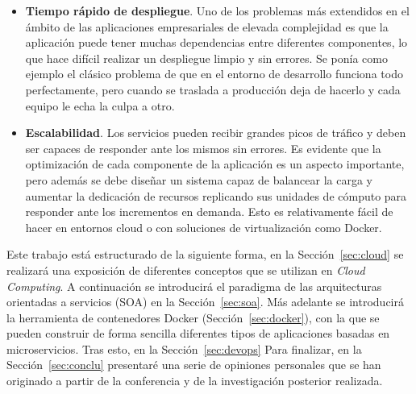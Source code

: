 \begin{itemize}
\begin{figure}
\caption{\label{fig:zerodt}Esquema de recuperación ante fallos.}
\end{figure}
Cómo se puede observar en la Figura~\ref{fig:zerodt}, cuando el servidor físico A falla, se desencadena una migración del contenedor virtual al servidor B. Lo que debería ocurrir sin complicaciones en caso de que el volumen de datos compartido por red siga disponible y solo haya ocurrido un problema aislado en la máquina A. En general, el demonio encargado de vigilar el correcto funcionamiento de los nodos se denomina \textit{watchdog} y su funcionamiento se basa en el intercambio periódico de mensajes con los nodos del cluster para intercambiar información del estado del servicio (\textit{keepalive o hearbeat}).
\item \textbf{Tiempo rápido de despliegue}. Uno de los problemas más extendidos en el ámbito de las aplicaciones empresariales de elevada complejidad es que la aplicación puede tener muchas dependencias entre diferentes componentes, lo que hace difícil realizar un despliegue limpio y sin errores. Se ponía como ejemplo el clásico problema de que en el entorno de desarrollo funciona todo perfectamente, pero cuando se traslada a producción deja de hacerlo y cada equipo le echa la culpa a otro.
\item \textbf{Escalabilidad}. Los servicios pueden recibir grandes picos de tráfico y deben ser capaces de responder ante los mismos sin errores. Es evidente que la optimización de cada componente de la aplicación es un aspecto importante, pero además se debe diseñar un sistema capaz de balancear la carga y aumentar la dedicación de recursos replicando sus unidades de cómputo para responder ante los incrementos en demanda. Esto es relativamente fácil de hacer en entornos cloud o con soluciones de virtualización como Docker.
\end{itemize}

Este trabajo está estructurado de la siguiente forma, en la Sección~\ref{sec:cloud} se realizará una exposición de diferentes conceptos que se utilizan en \emph{Cloud Computing}. A continuación se introducirá el paradigma de las arquitecturas orientadas a servicios (SOA) en la Sección~\ref{sec:soa}. Más adelante se introducirá la herramienta de contenedores Docker (Sección~\ref{sec:docker}), con la que se pueden construir de forma sencilla diferentes tipos de aplicaciones basadas en microservicios. Tras esto, en la Sección~\ref{sec:devops} Para finalizar, en la Sección~\ref{sec:conclu} presentaré una serie de opiniones personales que se han originado a partir de la conferencia y de la investigación posterior realizada.

